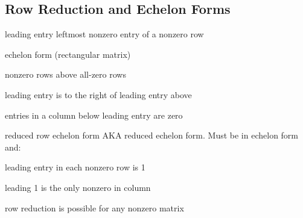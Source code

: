 \begin{card}
    \subsection{Row Reduction and Echelon Forms}

    \begin{compactdesc}
    \item[leading entry] leftmost nonzero entry of a nonzero row
    \item[echelon form] (rectangular matrix)
        \begin{compactenum}
        \item nonzero rows above all-zero rows
        \item leading entry is to the right of leading entry above
        \item entries in a column below leading entry are zero
        \end{compactenum}
    \item[reduced row echelon form] AKA reduced echelon form.
        Must be in echelon form and:
        \begin{compactenum}
        \item leading entry in each nonzero row is 1
        \item leading 1 is the only nonzero in column
        \end{compactenum}
    \item[row reduction] is possible for any nonzero matrix


\end{compactdesc}
\end{card}

